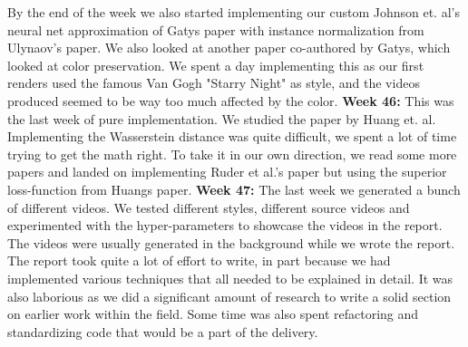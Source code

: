 By the end of the week we also started implementing our custom Johnson et. al's neural net approximation of Gatys paper with instance normalization from Ulynaov's paper. We also looked at another paper co-authored by Gatys, which looked at color preservation. We spent a day implementing this as our first renders used the famous Van Gogh "Starry Night" as style, and the videos produced seemed to be way too much affected by the color.
\newline\newline
\textbf{Week 46:} \newline
This was the last week of pure implementation. We studied the paper by Huang et. al. Implementing the Wasserstein distance was quite difficult, we spent a lot of time trying to get the math right. To take it in our own direction, we read some more papers and landed on implementing Ruder et al.'s paper \cite{Ruder:1} but using the superior loss-function from Huangs paper.
\newline\newline
\textbf{Week 47:} \newline
The last week we generated a bunch of different videos. We tested different styles, different source videos and experimented with the hyper-parameters to showcase the videos in the report. The videos were usually generated in the background while we wrote the report. The report took quite a lot of effort to write, in part because we had implemented various techniques that all needed to be explained in detail. It was also laborious as we did a significant amount of research to write a solid section on earlier work within the field. Some time was also spent refactoring and standardizing code that would be a part of the delivery.
